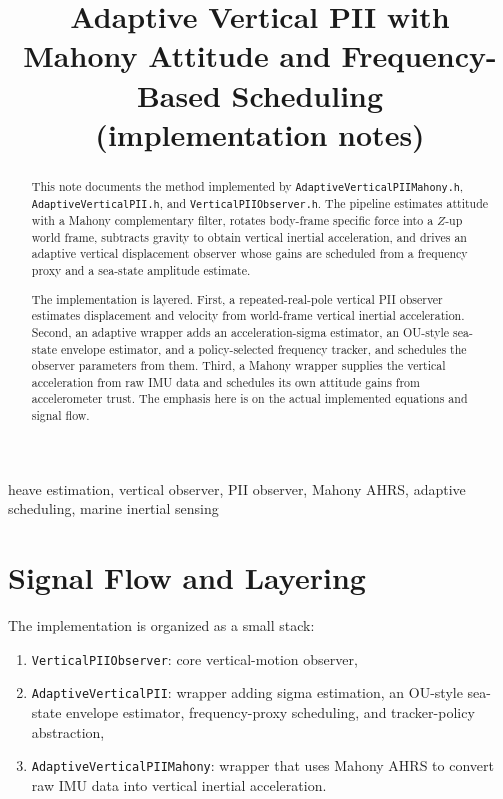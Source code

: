\documentclass[conference]{IEEEtran}
\title{Adaptive Vertical PII with Mahony Attitude and Frequency-Based Scheduling\\
(implementation notes)}
\author{%
    \IEEEauthorblockN{Mikhail S.\ Grushinskiy}
    \IEEEauthorblockA{Bareboat Necessities Project\\
    \texttt{mgrouch@users.github.com}}
}
\begin{document}
    \maketitle

    \begin{abstract}
        This note documents the method implemented by
        \texttt{AdaptiveVerticalPIIMahony.h},
        \texttt{AdaptiveVerticalPII.h}, and
        \texttt{VerticalPIIObserver.h}.
        The pipeline estimates attitude with a Mahony complementary filter,
        rotates body-frame specific force into a \(Z\)-up world frame,
        subtracts gravity to obtain vertical inertial acceleration,
        and drives an adaptive vertical displacement observer whose gains are
        scheduled from a frequency proxy and a sea-state amplitude estimate.

        The implementation is layered.
        First, a repeated-real-pole vertical PII observer estimates
        displacement and velocity from world-frame vertical inertial acceleration.
        Second, an adaptive wrapper adds an acceleration-sigma estimator, an
        OU-style sea-state envelope estimator, and a policy-selected frequency
        tracker, and schedules the observer parameters from them.
        Third, a Mahony wrapper supplies the vertical acceleration from raw IMU
        data and schedules its own attitude gains from accelerometer trust.
        The emphasis here is on the actual implemented equations and signal flow.
    \end{abstract}


    \begin{IEEEkeywords}
        heave estimation, vertical observer, PII observer, Mahony AHRS,
        adaptive scheduling, marine inertial sensing
    \end{IEEEkeywords}

    \section{Signal Flow and Layering}

    The implementation is organized as a small stack:
    \begin{enumerate}[leftmargin=1.5em]
        \item \texttt{VerticalPIIObserver}: core vertical-motion observer,
        \item \texttt{AdaptiveVerticalPII}: wrapper adding sigma estimation, an
        OU-style sea-state envelope estimator, frequency-proxy scheduling, and
        tracker-policy abstraction,
        \item \texttt{AdaptiveVerticalPIIMahony}: wrapper that uses Mahony AHRS
        to convert raw IMU data into vertical inertial acceleration.
    \end{enumerate}
\end{document}

